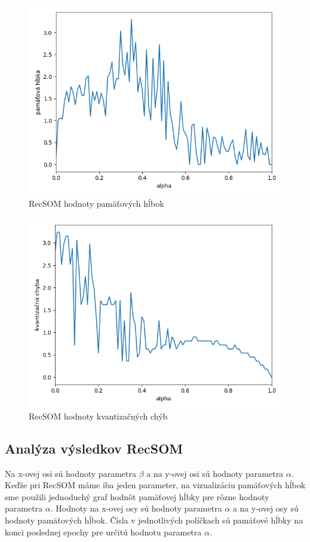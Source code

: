     \begin{figure}[H]
        \centering
        \includegraphics[width=\textwidth]{assets/r_memory_span}
        \caption{RecSOM hodnoty pamäťových hĺbok}
        \label{recsom_memory_span}
    \end{figure}
    
    \begin{figure}[H]
        \centering
        \includegraphics[width=\textwidth]{assets/r_errors}
        \caption{RecSOM hodnoty kvantizačných chýb}
        \label{recsom_errors}
    \end{figure}

\subsection{Analýza výsledkov RecSOM}
Na x-ovej osi sú hodnoty parametra $\beta$ a na y-ovej osi sú hodnoty parametra $\alpha$.
Keďže pri RecSOM máme iba jeden parameter, na vizualizáciu pamäťových hĺbok sme použili jednoduchý graf hodnôt pamäťovej hĺbky pre rôzne hodnoty parametra $\alpha$.
Hodnoty na x-ovej osy sú hodnoty parametra $\alpha$  a na y-ovej osy sú hodnoty pamäťových hĺbok. 
Čísla v jednotlivých políčkach sú pamäťové hĺbky na konci poslednej epochy pre určitú hodnotu parametra $\alpha$.

